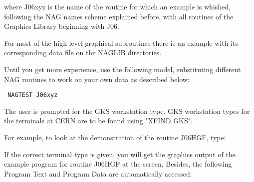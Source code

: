 where J06xyz is the name of the routine for which an example is
whished, following the NAG names scheme explained before, with all
routines of the Graphics Library beginning with J06.
 
For most of the high level graphical subroutines there is an example with
its corresponding data file on the NAGLIB directories.
 
Until  you get  more experience,  use the  following model,  substituting
different NAG routines to work on your own data as described below:
 
\begin{verbatim}
 NAGTEST J06xyz
\end{verbatim}
 
The user is prompted for the GKS workstation type.  GKS workstation types
for  the terminals  at  CERN are  to  be found  using  "XFIND GKS".
 
For example, to look at the demonstration of the routine J06HGF, type:
 
 
If the  correct terminal type  is given, you will  get the graphics
output  of the
example program for  routine J06HGF  at  the  screen.  Besides,  the
following Program Text and Program Data are automatically accessed:
 
